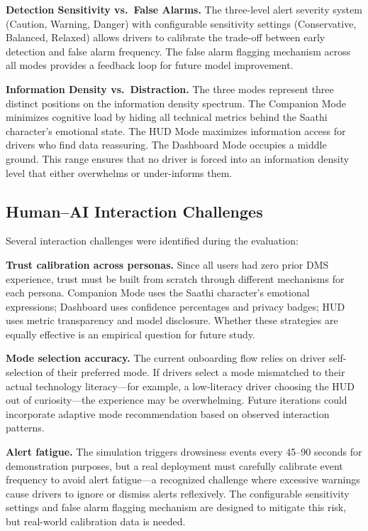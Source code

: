 \documentclass[sigconf]{acmart}
\begin{document}
\textbf{Detection Sensitivity vs.\ False Alarms.} The three-level alert severity system (Caution, Warning, Danger) with configurable sensitivity settings (Conservative, Balanced, Relaxed) allows drivers to calibrate the trade-off between early detection and false alarm frequency. The false alarm flagging mechanism across all modes provides a feedback loop for future model improvement.

\textbf{Information Density vs.\ Distraction.} The three modes represent three distinct positions on the information density spectrum. The Companion Mode minimizes cognitive load by hiding all technical metrics behind the Saathi character's emotional state. The HUD Mode maximizes information access for drivers who find data reassuring. The Dashboard Mode occupies a middle ground. This range ensures that no driver is forced into an information density level that either overwhelms or under-informs them.

\subsection{Human--AI Interaction Challenges}

Several interaction challenges were identified during the evaluation:

\textbf{Trust calibration across personas.} Since all users had zero prior DMS experience, trust must be built from scratch through different mechanisms for each persona. Companion Mode uses the Saathi character's emotional expressions; Dashboard uses confidence percentages and privacy badges; HUD uses metric transparency and model disclosure. Whether these strategies are equally effective is an empirical question for future study.

\textbf{Mode selection accuracy.} The current onboarding flow relies on driver self-selection of their preferred mode. If drivers select a mode mismatched to their actual technology literacy---for example, a low-literacy driver choosing the HUD out of curiosity---the experience may be overwhelming. Future iterations could incorporate adaptive mode recommendation based on observed interaction patterns.

\textbf{Alert fatigue.} The simulation triggers drowsiness events every 45--90 seconds for demonstration purposes, but a real deployment must carefully calibrate event frequency to avoid alert fatigue---a recognized challenge where excessive warnings cause drivers to ignore or dismiss alerts reflexively. The configurable sensitivity settings and false alarm flagging mechanism are designed to mitigate this risk, but real-world calibration data is needed.
\end{document}
